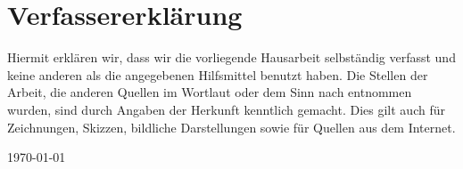 \documentclass[./dokumentation.tex]{subfiles}
\begin{document}
\section*{Verfassererklärung}
Hiermit erklären wir, dass wir die vorliegende Hausarbeit selbständig verfasst und keine anderen als die angegebenen Hilfsmittel benutzt haben.
Die Stellen der Arbeit, die anderen Quellen im Wortlaut oder dem Sinn nach entnommen wurden, sind durch Angaben der Herkunft kenntlich gemacht. Dies gilt auch für Zeichnungen, Skizzen, bildliche Darstellungen sowie für Quellen aus dem Internet. \\
\vspace{3cm}

\today \\
 
\end{document}
